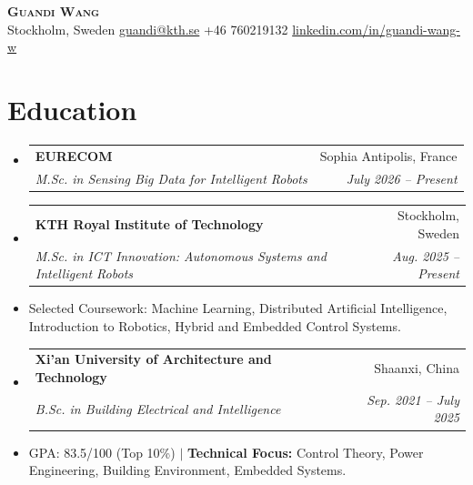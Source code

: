 \documentclass[11pt, letterpaper]{article}
\makeatletter
\newcommand{\resumeItem}[1]{
  \item\small{
    {#1 \vspace{-2pt}}
  }
}
\newcommand{\resumeSubheading}[4]{
  \vspace{-1pt}\item
    \begin{tabular*}{\linewidth}[t]{@{\extracolsep{\fill}}lr@{}}
      \textbf{#1} & #2 \\
      \textit{\small#3} & \textit{\small #4} \\
    \end{tabular*}\vspace{-5pt}
}
\makeatother
\begin{document}
\begin{center}
    \textbf{\Huge \scshape Guandi Wang} \\ \vspace{4pt}
    \small
     Stockholm, Sweden \quad
     \href{mailto:guandi@kth.se}{guandi@kth.se} \quad
     +46 760219132 \quad
     \href{https://www.linkedin.com/in/guandi-wang-w}{linkedin.com/in/guandi-wang-w}
\end{center}
\section{Education}
\begin{itemize}
  \resumeSubheading
    {EURECOM}{Sophia Antipolis, France}
    {M.Sc. in Sensing Big Data for Intelligent Robots}{July 2026 -- Present}
  \resumeSubheading
    {KTH Royal Institute of Technology}{Stockholm, Sweden}
    {M.Sc. in ICT Innovation: Autonomous Systems and Intelligent Robots}{Aug. 2025 -- Present}
    \resumeItem{Selected Coursework: Machine Learning, Distributed Artificial Intelligence, Introduction to Robotics, Hybrid and Embedded Control Systems.}
  \resumeSubheading
    {Xi'an University of Architecture and Technology}{Shaanxi, China}
    {B.Sc. in Building Electrical and Intelligence}{Sep. 2021 -- July 2025}
    \resumeItem{GPA: 83.5/100 (Top 10\%) $|$ \textbf{Technical Focus:} Control Theory, Power Engineering, Building Environment, Embedded Systems.}
\end{itemize}
\end{document}
